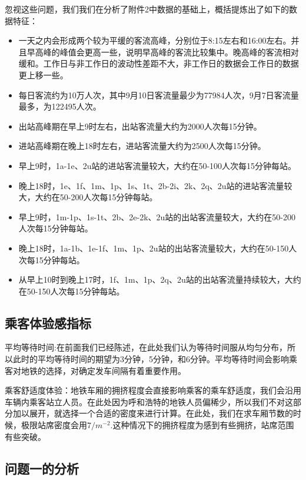 \documentclass[12pt,a4paper]{mcmthesis}
\begin{document}
    忽视这些问题，我们我们在分析了附件2中数据的基础上，概括提炼出了如下的数据特征：

    \begin{itemize}
        \item 一天之内会形成两个较为平缓的客流高峰，分别位于8:15左右和16:00左右。并且早高峰的峰值会更高一些，说明早高峰的客流比较集中。晚高峰的客流相对缓和。工作日与非工作日的波动性差距不大，非工作日的数据会工作日的数据更上移一些。
        \item 每日客流约为10万人次，其中9月10日客流量最少为77984人次，9月7日客流量最多，为122495人次。
        \item 出站高峰期在早上9时左右，出站客流量大约为2000人次每15分钟。
        \item 进站高峰期在晚上18时左右，进站客流量大约为2500人次每15分钟。
        \item 早上9时，1a-1e、2u站的进站客流量较大，大约在50-100人次每15分钟每站。
        \item 晚上18时，1e、1f、1m、1p、1s、1t、2b-2i、2k、2q、2u站的进站客流量较大，大约在50-200人次每15分钟每站。
        \item 早上9时，1m-1p、1s-1t、2b、2e-2k、2u站的出站客流量较大，大约在50-200人次每15分钟每站。
        \item 晚上18时，1a-1b、1e-1f、1m、1p、2u站的出站客流量较大，大约在50-150人次每15分钟每站。
        \item 从早上10时到晚上17时，1f、1m、1p、2q、2u站的出站客流量持续较大，大约在50-150人次每15分钟每站。
    \end{itemize}

    \subsection{乘客体验感指标}
    平均等待时间:在前面我们已经陈述，在此处我们认为等待时间服从均匀分布，所以此时的平均等待时间的期望为3分钟，5分钟，和6分钟。平均等待时间会影响乘客对地铁的选择，对确定发车间隔有着重要作用。

    乘客舒适度体验：地铁车厢的拥挤程度会直接影响乘客的乘车舒适度，我们会沿用车辆内乘客站立人员。在此处因为呼和浩特的地铁人员偏稀少，所以我们不对这部分加以展开，就选择一个合适的密度来进行计算。在此处，我们在求车厢节数的时候，极限站席密度会用$7/m^{-2}$.这种情况下的拥挤程度为感到有些拥挤，站席范围有些突破。

    \subsection{问题一的分析}
\end{document}
